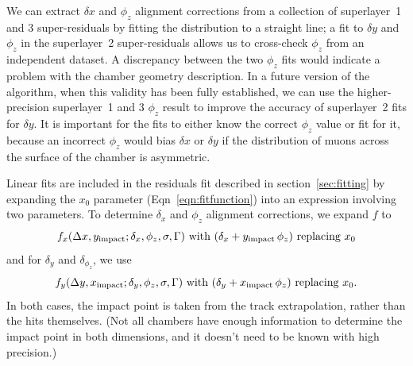 \documentclass[12pt]{article}
\begin{document}
We can extract $\delta x$ and $\phi_z$ alignment corrections from a
collection of superlayer~1 and 3 super-residuals by fitting the
distribution to a straight line; a fit to $\delta y$ and $\phi_z$ in
the superlayer~2 super-residuals allows us to cross-check $\phi_z$
from an independent dataset.  A discrepancy between the two $\phi_z$
fits would indicate a problem with the chamber geometry description.
In a future version of the algorithm, when this validity has been
fully established, we can use the higher-precision superlayer~1 and 3
$\phi_z$ result to improve the accuracy of superlayer~2 fits for
$\delta y$.  It is important for the fits to either know the correct
$\phi_z$ value or fit for it, because an incorrect $\phi_z$ would bias
$\delta x$ or $\delta y$ if the distribution of muons across the
surface of the chamber is asymmetric.

Linear fits are included in the residuals fit described in
section~\ref{sec:fitting} by expanding the $x_0$ parameter
(Eqn~\ref{eqn:fitfunction}) into an expression involving two
parameters.  To determine $\delta_x$ and $\phi_z$ alignment
corrections, we expand $f$ to
\begin{equation}
f_x(\Delta x, y_{\mbox{\scriptsize impact}}; \delta_x, \phi_z, \sigma, \Gamma) \mbox{ with } (\delta_x + y_{\mbox{\scriptsize impact}} \, \phi_z) \mbox{ replacing } x_0 \label{eqn:first_correction}
\end{equation}
and for $\delta_y$ and $\delta_{\phi_z}$, we use
\begin{equation}
f_y(\Delta y, x_{\mbox{\scriptsize impact}}; \delta_y, \phi_z, \sigma, \Gamma) \mbox{ with } (\delta_y + x_{\mbox{\scriptsize impact}} \, \phi_z) \mbox{ replacing } x_0 \mbox{.}
\end{equation}
In both cases, the impact point is taken from the track
extrapolation, rather than the hits themselves.  (Not all chambers
have enough information to determine the impact point in both
dimensions, and it doesn't need to be known with high precision.)
\end{document}
